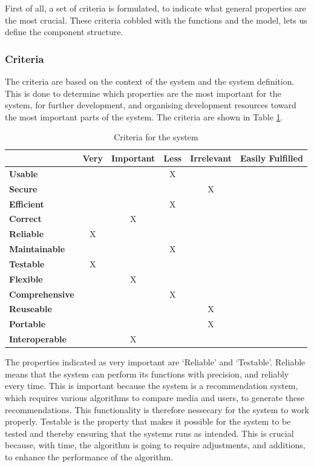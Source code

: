 First of all, a set of criteria is formulated, to indicate what general properties are the most crucial. These criteria cobbled with the functions and the model, lets us define the component structure.

\subsubsection{Criteria}

The criteria are based on the context of the system and the system definition. This is done to determine which properties are the most important for the system, for further development, and organising development resources toward the most important parts of the system. The criteria are shown in Table \ref{Criteria}.

\begin{table}[htb]
\centering
\begin{tabular}{|l|c|c|c|c|c|} \hline
	  & \textbf{Very} & \textbf{Important} & \textbf{Less} & \textbf{Irrelevant} & \textbf{Easily Fulfilled} \\ \hline
	\textbf{Usable} &  &  & X &  & \\ \hline
	\textbf{Secure} &  &  &  & X &  \\ \hline
	\textbf{Efficient} &  &  & X &  &  \\ \hline
	\textbf{Correct} &  & X &  &  &  \\ \hline
	\textbf{Reliable} & X &  &  &  &  \\ \hline
	\textbf{Maintainable} &  &  & X &  &  \\ \hline
	\textbf{Testable} & X &  &  &  &  \\ \hline
	\textbf{Flexible} &  & X &  &  &  \\ \hline
	\textbf{Comprehensive} &  &  & X &  &  \\ \hline
	\textbf{Reuseable} &  &  &  & X &  \\ \hline
	\textbf{Portable} &  &  &  & X &  \\ \hline
	\textbf{Interoperable} &  & X &  &  &  \\ \hline
\end{tabular}
\caption{Criteria for the system}
\label{Criteria}
\end{table}

The properties indicated as very important are ‘Reliable’ and ‘Testable’. Reliable means that the system can perform its functions with precision, and reliably every time. This is important because the system is a recommendation system, which requires various algorithms to compare media and users, to generate these recommendations. This functionality is therefore nessecary for the system to work properly. Testable is the property that makes it possible for the system to be tested and thereby ensuring that the systems runs as intended. This is crucial because, with time, the algorithm is going to require adjustments, and additions, to enhance the performance of the algorithm.

